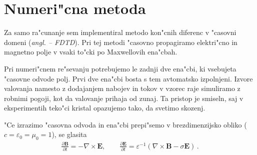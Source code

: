 \documentclass[a4paper,10pt]{article}
\newcommand{\todo}[1]{(\textbf{\textsmaller{TODO}: #1})}
\newcommand{\odvod}[2]{\frac{\partial #1}{\partial #2}}
\renewcommand{\vec}{\mathbf}
\newcommand{\eps}{\varepsilon}
\newcommand{\angl}[1]{(\textit{angl. #1})}
\renewcommand{\acf}[1]{\aclu{#1} -- \acs{#1}}
\begin{document}

\section{Numeri"cna metoda}

Za samo ra"cunanje sem implementiral metodo kon"cnih diferenc v "casovni domeni \angl{\acf{FDTD}}\cite{taflove}. 
Pri tej metodi "casovno propagiramo elektri"cno in magnetno polje v vsaki to"cki po Maxwellovih ena"cbah. 

Pri numeri"cnem re"sevanju potrebujemo le zadnji dve ena"cbi, ki vsebujeta "casovne odvode polj. 
Prvi dve ena"cbi bosta s tem avtomatsko izpolnjeni. 
Izvore valovanja namesto z dodajanjem nabojev in tokov v vzorec raje simuliramo z robnimi pogoji, kot da valovanje prihaja od zunaj. 
Ta pristop je smiseln, saj v eksperimentih teko"ci kristal opazujemo tako, da svetimo skozenj. 

"Ce izrazimo "casovna odvoda in ena"cbi prepi"semo v brezdimenzijsko obliko ($c = \varepsilon_0 = \mu_0 = 1$), se glasita
\begin{align}
\label{eq:maxwell-base}
 \odvod{\vec{B}}{t} = -\nabla \times \vec{E}, \qquad \odvod{\vec{E}}{t} = \eps^{-1} (\nabla \times \vec{B} - \sigma \vec E)\,.
\end{align}
\end{document}
